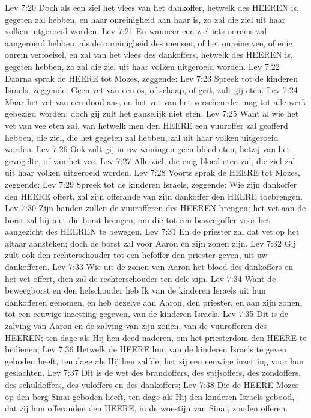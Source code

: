 Lev 7:20  Doch als een ziel het vlees van het dankoffer, hetwelk des HEEREN is, gegeten zal hebben, en haar onreinigheid aan haar is, zo zal die ziel uit haar volken uitgeroeid worden.
Lev 7:21  En wanneer een ziel iets onreins zal aangeroerd hebben, als de onreinigheid des mensen, of het onreine vee, of enig onrein verfoeisel, en zal van het vlees des dankoffers, hetwelk des HEEREN is, gegeten hebben, zo zal die ziel uit haar volken uitgeroeid worden.
Lev 7:22  Daarna sprak de HEERE tot Mozes, zeggende:
Lev 7:23  Spreek tot de kinderen Israels, zeggende: Geen vet van een os, of schaap, of geit, zult gij eten.
Lev 7:24  Maar het vet van een dood aas, en het vet van het verscheurde, mag tot alle werk gebezigd worden; doch gij zult het ganselijk niet eten.
Lev 7:25  Want al wie het vet van vee eten zal, van hetwelk men den HEERE een vuuroffer zal geofferd hebben, die ziel, die het gegeten zal hebben, zal uit haar volken uitgeroeid worden.
Lev 7:26  Ook zult gij in uw woningen geen bloed eten, hetzij van het gevogelte, of van het vee.
Lev 7:27  Alle ziel, die enig bloed eten zal, die ziel zal uit haar volken uitgeroeid worden.
Lev 7:28  Voorts sprak de HEERE tot Mozes, zeggende:
Lev 7:29  Spreek tot de kinderen Israels, zeggende: Wie zijn dankoffer den HEERE offert, zal zijn offerande van zijn dankoffer den HEERE toebrengen.
Lev 7:30  Zijn handen zullen de vuurofferen des HEEREN brengen; het vet aan de borst zal hij met die borst brengen, om die tot een beweegoffer voor het aangezicht des HEEREN te bewegen.
Lev 7:31  En de priester zal dat vet op het altaar aansteken; doch de borst zal voor Aaron en zijn zonen zijn.
Lev 7:32  Gij zult ook den rechterschouder tot een hefoffer den priester geven, uit uw dankofferen.
Lev 7:33  Wie uit de zonen van Aaron het bloed des dankoffers en het vet offert, dien zal de rechterschouder ten dele zijn.
Lev 7:34  Want de beweegborst en den hefschouder heb Ik van de kinderen Israels uit hun dankofferen genomen, en heb dezelve aan Aaron, den priester, en aan zijn zonen, tot een eeuwige inzetting gegeven, van de kinderen Israels.
Lev 7:35  Dit is de zalving van Aaron en de zalving van zijn zonen, van de vuurofferen des HEEREN; ten dage als Hij hen deed naderen, om het priesterdom den HEERE te bedienen;
Lev 7:36  Hetwelk de HEERE hun van de kinderen Israels te geven geboden heeft, ten dage als Hij hen zalfde; het zij een eeuwige inzetting voor hun geslachten.
Lev 7:37  Dit is de wet des brandoffers, des spijsoffers, des zondoffers, des schuldoffers, des vuloffers en des dankoffers;
Lev 7:38  Die de HEERE Mozes op den berg Sinai geboden heeft, ten dage als Hij den kinderen Israels gebood, dat zij hun offeranden den HEERE, in de woestijn van Sinai, zouden offeren.
